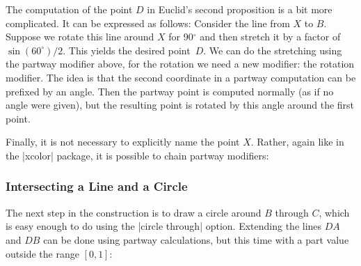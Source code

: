 The computation of the point $D$ in Euclid's second proposition is a
bit more complicated. It can be expressed as follows: Consider the
line from $X$ to $B$. Suppose we 
rotate this line around $X$ for 90$^\circ$ and then stretch it by a
factor of $\sin(60^\circ)/2$. This yields the desired point~$D$. We
can do the stretching using the partway modifier above, for the
rotation we need a new modifier: the rotation modifier. The idea is
that the second coordinate in a partway computation can be prefixed by
an angle. Then the partway point is computed normally (as if no angle
were given), but the resulting point is rotated by this angle around
the first point.  

\begin{codeexample}[]
\end{codeexample}

Finally, it is not necessary to explicitly name the point $X$. Rather,
again like in the |xcolor| package, it is possible to chain partway
modifiers:

\begin{codeexample}[]
\end{codeexample}


\subsubsection{Intersecting a Line and a Circle}

The next step in the construction is to draw a circle around $B$
through $C$, which is easy enough to do using the |circle through|
option. Extending the lines $DA$ and $DB$ can be done using partway
calculations, but this time with a part value outside the range
$[0,1]$: 

\begin{codeexample}[]
\end{codeexample}

